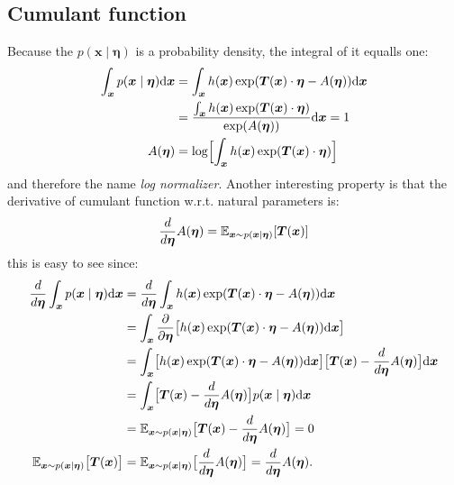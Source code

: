 \subsection{Cumulant function}
Because the $p(\boldsymbol{x}\mid \boldsymbol{\eta})$ is a probability density, the integral of it equalls one:
\begin{align}
    \int_{\boldsymbol{x}} p(\boldsymbol{x}\mid \boldsymbol{\eta}) \mbox{\rm d}\boldsymbol{x} &= \int_{\boldsymbol{x}} h(\boldsymbol{x}) \exp( \boldsymbol{T}(\boldsymbol{x}) \cdot \boldsymbol{\eta} - A(\boldsymbol{\eta})) \mbox{\rm d}\boldsymbol{x} \notag  \\
    &=  \frac{ \int_{\boldsymbol{x}}  h(\boldsymbol{x})\exp( \boldsymbol{T}(\boldsymbol{x}) \cdot \boldsymbol{\eta})}{\exp(A(\boldsymbol{\eta}))}  \mbox{\rm d}\boldsymbol{x} = 1  \notag\\
    A(\boldsymbol{\eta}) &= \log\Bigl[ \int_{\boldsymbol{x}} h(\boldsymbol{x})\exp( \boldsymbol{T}(\boldsymbol{x}) \cdot \boldsymbol{\eta})\Bigr] \label{eq:log_norm}
\end{align}
and therefore the name \textit{log normalizer}. Another interesting property is that the derivative of cumulant function w.r.t. natural parameters is:
$$
\frac{d}{d \boldsymbol{\eta}} A(\boldsymbol{\eta}) = \operatorname{\mathbb{E}}_{\boldsymbol{x} \sim p(\boldsymbol{x}\mid \boldsymbol{\eta})} [\boldsymbol{T}(\boldsymbol{x})]
$$
this is easy to see since:
\begin{align*}
    \frac{d}{d \boldsymbol{\eta}} \int_{\boldsymbol{x}} p(\boldsymbol{x}\mid \boldsymbol{\eta}) \mbox{\rm d}\boldsymbol{x}&= \frac{d}{d \boldsymbol{\eta}}   \int_{\boldsymbol{x}} h(\boldsymbol{x}) \exp( \boldsymbol{T}(\boldsymbol{x}) \cdot \boldsymbol{\eta} - A(\boldsymbol{\eta})) \mbox{\rm d}\boldsymbol{x} \\
    &=\int_{\boldsymbol{x}}  \frac{\partial}{\partial \boldsymbol{\eta}} \bigl[h(\boldsymbol{x}) \exp( \boldsymbol{T}(\boldsymbol{x}) \cdot \boldsymbol{\eta} - A(\boldsymbol{\eta})) \mbox{\rm d}\boldsymbol{x} \bigr]  \\
    &=\int_{\boldsymbol{x}}  \bigl[h(\boldsymbol{x}) \exp( \boldsymbol{T}(\boldsymbol{x}) \cdot \boldsymbol{\eta} - A(\boldsymbol{\eta})) \mbox{\rm d}\boldsymbol{x} \bigr] \bigl[ \boldsymbol{T}(\boldsymbol{x}) - \frac{d}{d\boldsymbol{\eta}} A(\boldsymbol{\eta}) \bigr]\mbox{\rm d}\boldsymbol{x} \\
    &=\int_{\boldsymbol{x}}  \bigl[\boldsymbol{T}(\boldsymbol{x}) - \frac{d}{d\boldsymbol{\eta}} A(\boldsymbol{\eta})\bigr] p(\boldsymbol{x}\mid \boldsymbol{\eta}) \mbox{\rm d}\boldsymbol{x}  \\
    &=\operatorname{\mathbb{E}}_{\boldsymbol{x} \sim p(\boldsymbol{x}\mid \boldsymbol{\eta})}\bigl[\boldsymbol{T}(\boldsymbol{x}) - \frac{d}{d\boldsymbol{\eta}} A(\boldsymbol{\eta}) \bigr] = 0 \\
    \operatorname{\mathbb{E}}_{\boldsymbol{x} \sim p(\boldsymbol{x}\mid \boldsymbol{\eta})}\bigl[\boldsymbol{T}(\boldsymbol{x})\bigr] &= \operatorname{\mathbb{E}}_{\boldsymbol{x} \sim p(\boldsymbol{x}\mid \boldsymbol{\eta})} \bigl[\frac{d}{d\boldsymbol{\eta}} A(\boldsymbol{\eta}) \bigr] = \frac{d}{d\boldsymbol{\eta}} A(\boldsymbol{\eta}).
\end{align*}
